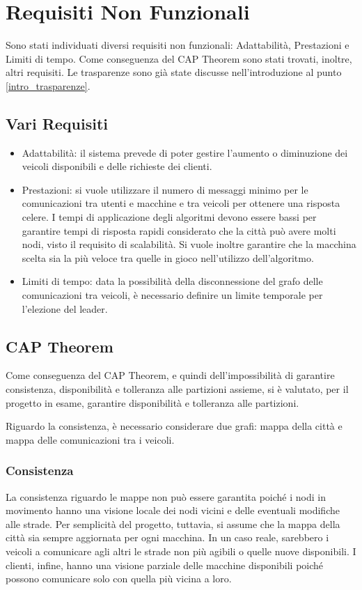 \section{Requisiti Non Funzionali} \label{requisiti_non_funzionali}
Sono stati individuati diversi requisiti non funzionali: Adattabilità, Prestazioni e Limiti di tempo. Come conseguenza del CAP Theorem sono stati trovati, inoltre, altri requisiti.
Le trasparenze sono già state discusse nell'introduzione al punto \ref{intro_trasparenze}.

\subsection{Vari Requisiti}
\begin{itemize}
	\item Adattabilità: il sistema prevede di poter gestire l'aumento o diminuzione dei veicoli disponibili e delle richieste dei clienti.
	\item Prestazioni: si vuole utilizzare il numero di messaggi minimo per le comunicazioni tra utenti e macchine e tra veicoli per ottenere una risposta celere. I tempi di applicazione degli algoritmi devono essere bassi per garantire tempi di risposta rapidi considerato che la città può avere molti nodi, visto il requisito di scalabilità. Si vuole inoltre garantire che la macchina scelta sia la più veloce tra quelle in gioco nell'utilizzo dell'algoritmo.
	\item Limiti di tempo: data la possibilità della disconnessione del grafo delle comunicazioni tra veicoli, è necessario definire un limite temporale per l'elezione del leader.
\end{itemize}

\subsection{CAP Theorem}\label{cap_theorem_definizioni}
Come conseguenza del CAP Theorem, e quindi dell'impossibilità di garantire consistenza, disponibilità e tolleranza alle partizioni assieme, si è valutato, per il progetto in esame, garantire disponibilità e tolleranza alle partizioni.

Riguardo la consistenza, è necessario considerare due grafi: mappa della città e mappa delle comunicazioni tra i veicoli. 

\subsubsection{Consistenza}
La consistenza riguardo le mappe non può essere garantita poiché i nodi in movimento hanno una visione locale dei nodi vicini e delle eventuali modifiche alle strade. Per semplicità del progetto, tuttavia, si assume che la mappa della città sia sempre aggiornata per ogni macchina. In un caso reale, sarebbero i veicoli a comunicare agli altri le strade non più agibili o quelle nuove disponibili. I clienti, infine, hanno una visione parziale delle macchine disponibili poiché possono comunicare solo con quella più vicina a loro.

